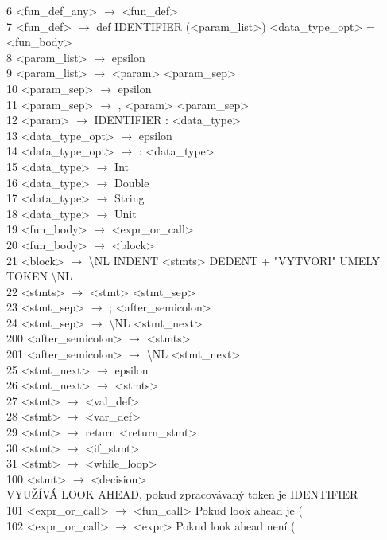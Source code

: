 \documentclass[10pt,a4paper]{article}
\begin{document}
6 <fun\_def\_any> $\to$ <fun\_def>\\
7 <fun\_def> $\to$ def IDENTIFIER (<param\_list>) <data\_type\_opt> = <fun\_body>\\
8 <param\_list> $\to$ epsilon\\
9 <param\_list> $\to$ <param> <param\_sep>\\
10 <param\_sep> $\to$ epsilon\\
11 <param\_sep> $\to$ , <param> <param\_sep>\\
12 <param> $\to$ IDENTIFIER : <data\_type>\\
13 <data\_type\_opt> $\to$ epsilon\\
14 <data\_type\_opt> $\to$ : <data\_type>\\
15 <data\_type> $\to$ Int\\
16 <data\_type> $\to$ Double\\
17 <data\_type> $\to$ String\\
18 <data\_type> $\to$ Unit\\
19 <fun\_body> $\to$ <expr\_or\_call>\\
20 <fun\_body> $\to$ <block>\\
21 <block> $\to$ \textbackslash NL INDENT <stmts> DEDENT  + "VYTVORI" UMELY TOKEN \textbackslash NL\\
22 <stmts> $\to$ <stmt> <stmt\_sep>\\
23 <stmt\_sep> $\to$ ; <after\_semicolon>\\
24 <stmt\_sep> $\to$ \textbackslash NL <stmt\_next>\\
200 <after\_semicolon> $\to$ <stmts>\\
201 <after\_semicolon> $\to$ \textbackslash NL <stmt\_next>\\
25 <stmt\_next> $\to$ epsilon\\
26 <stmt\_next> $\to$ <stmts>\\
27 <stmt> $\to$ <val\_def>\\
28 <stmt> $\to$ <var\_def>\\
29 <stmt> $\to$ return <return\_stmt>\\
30 <stmt> $\to$ <if\_stmt>\\
31 <stmt> $\to$ <while\_loop>\\
100 <stmt> $\to$ <decision>\\

VYUŽÍVÁ LOOK AHEAD, pokud zpracovávaný token je IDENTIFIER\\
101 <expr\_or\_call> $\to$ <fun\_call>   \hspace{0.7cm}   Pokud look ahead je (\\
102 <expr\_or\_call> $\to$ <expr>   \hspace{0.7cm}   Pokud look ahead není (\\
\end{document}
